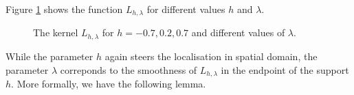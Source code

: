 \documentclass[11pt,a4paper,twoside,bibtotoc]{scrartcl}
\theoremstyle{plain}
\theoremstyle{definition}
\theoremstyle{remark}
\numberwithin{equation}{section}
\numberwithin{table}{section}
\numberwithin{figure}{section}
\begin{document}
Figure \ref{Basics:Figure:LKernel} shows the function $L_{h,\lambda}$ for
different values $h$ and $\lambda$.
\begin{figure}[tb]
  \centering
  \hfill
  \caption{The kernel $L_{h,\lambda}$ for $h = -0.7, 0.2, 0.7$ and different values of $\lambda$.}
  \label{Basics:Figure:LKernel}
\end{figure}
While the parameter $h$ again steers the localisation in spatial domain, the
parameter $\lambda$ correponds to the smoothness of $L_{h,\lambda}$ in the
endpoint of the support $h$.
More formally, we have the following lemma.
\end{document}
